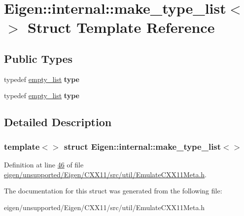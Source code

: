 \hypertarget{struct_eigen_1_1internal_1_1make__type__list_3_4}{}\section{Eigen\+:\+:internal\+:\+:make\+\_\+type\+\_\+list$<$$>$ Struct Template Reference}
\label{struct_eigen_1_1internal_1_1make__type__list_3_4}
\subsection*{Public Types}
\begin{DoxyCompactItemize}
\item 
\mbox{\label{struct_eigen_1_1internal_1_1make__type__list_3_4_ae734d454dfcab0654128bbc101a3ea56}} 
typedef \hyperlink{struct_eigen_1_1internal_1_1empty__list}{empty\+\_\+list} {\bfseries type}
\item 
\mbox{\label{struct_eigen_1_1internal_1_1make__type__list_3_4_ae734d454dfcab0654128bbc101a3ea56}} 
typedef \hyperlink{struct_eigen_1_1internal_1_1empty__list}{empty\+\_\+list} {\bfseries type}
\end{DoxyCompactItemize}


\subsection{Detailed Description}
\subsubsection*{template$<$$>$\newline
struct Eigen\+::internal\+::make\+\_\+type\+\_\+list$<$$>$}



Definition at line \hyperlink{eigen_2unsupported_2_eigen_2_c_x_x11_2src_2util_2_emulate_c_x_x11_meta_8h_source_l00046}{46} of file \hyperlink{eigen_2unsupported_2_eigen_2_c_x_x11_2src_2util_2_emulate_c_x_x11_meta_8h_source}{eigen/unsupported/\+Eigen/\+C\+X\+X11/src/util/\+Emulate\+C\+X\+X11\+Meta.\+h}.



The documentation for this struct was generated from the following file\+:\begin{DoxyCompactItemize}
\item 
eigen/unsupported/\+Eigen/\+C\+X\+X11/src/util/\+Emulate\+C\+X\+X11\+Meta.\+h\end{DoxyCompactItemize}

